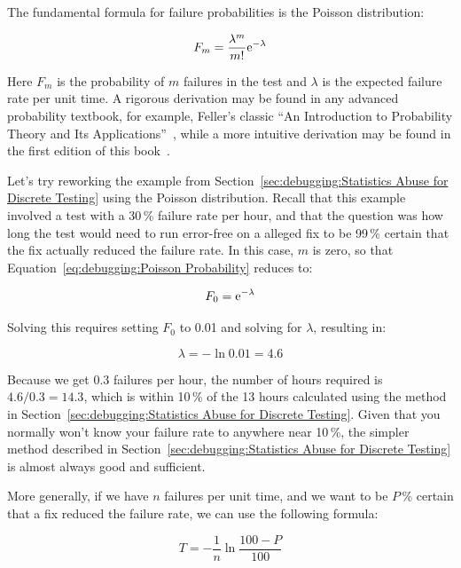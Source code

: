 The fundamental formula for failure probabilities is the Poisson
distribution:

\begin{equation}
	F_m = \frac{\lambda^m}{m!} \mathrm{e}^{-\lambda}
\label{eq:debugging:Poisson Probability}
\end{equation}

Here $F_m$ is the probability of $m$ failures in the test and
$\lambda$ is the expected failure rate per unit time.
A rigorous derivation may be found in any advanced probability
textbook, for example, Feller's classic ``An Introduction to Probability
Theory and Its Applications''~\cite{Feller58}, while a more
intuitive derivation may be found in the first edition of
this book~\cite[Equations 11.8--11.26]{McKenney2014ParallelProgramming-e1}.

Let's try reworking the example from
Section~\ref{sec:debugging:Statistics Abuse for Discrete Testing}
using the Poisson distribution.
Recall that this example involved a test with a 30\,\% failure rate per
hour, and that the question was how long the test would need to run
error-free
on a alleged fix to be 99\,\% certain that the fix actually reduced the
failure rate.
In this case, $m$ is zero, so that
Equation~\ref{eq:debugging:Poisson Probability} reduces to:

\begin{equation}
	F_0 =  \mathrm{e}^{-\lambda}
\end{equation}

Solving this requires setting $F_0$
to 0.01 and solving for $\lambda$, resulting in:

\begin{equation}
	\lambda = - \ln 0.01 = 4.6
\end{equation}

Because we get $0.3$ failures per hour, the number of hours required
is $4.6/0.3 = 14.3$, which is within 10\,\% of the 13 hours
calculated using the method in
Section~\ref{sec:debugging:Statistics Abuse for Discrete Testing}.
Given that you normally won't know your failure rate to anywhere near
10\,\%, the simpler method described in
Section~\ref{sec:debugging:Statistics Abuse for Discrete Testing}
is almost always good and sufficient.

More generally, if we have $n$ failures per unit time, and we want to
be $P$\,\% certain that a fix reduced the failure rate, we can use the
following formula:

\begin{equation}
	T = - \frac{1}{n} \ln \frac{100 - P}{100}
\label{eq:debugging:Error-Free Test Duration}
\end{equation}

